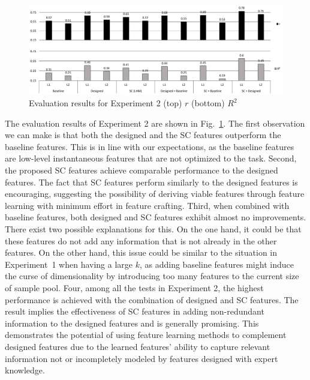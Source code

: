 \documentclass{article}
\begin{document}

\begin{figure}
\centering
\includegraphics[width = 17.2 cm]{./figs/exp2_remake.pdf}
\caption{Evaluation results for Experiment 2 (top) $r$ (bottom) $R^{2}$}
\label{fig:exp2}
\end{figure}




The evaluation results of Experiment 2 are shown in Fig.~\ref{fig:exp2}. The first observation we can make is that both the designed and the SC features outperform the baseline features. This is in line with our expectations, as the baseline features are low-level instantaneous features that are not optimized to the task. %
Second, the proposed SC features achieve comparable performance to the designed features. The fact that SC features perform similarly to the designed features is encouraging, suggesting the possibility of deriving viable features through feature learning with minimum effort in feature crafting. 
Third, when combined with baseline features, both designed and SC features exhibit almost no improvements. There exist two possible explanations for this. On the one hand, it could be that these features do not add any information that is not already in the other features. On the other hand, this issue could be similar to the situation in Experiment~1 when having a large $k$, as adding baseline features might induce the curse of dimensionality by introducing too many features to the current size of sample pool. %
Four, among all the tests in Experiment 2, the highest performance is achieved with the combination of designed and SC features. The result implies the effectiveness of SC features in adding non-redundant information to the designed features and is generally promising. This demonstrates the potential of using feature learning methods to complement designed features due to the learned features' ability to capture relevant information not or incompletely modeled by features designed with expert knowledge.
\end{document}
